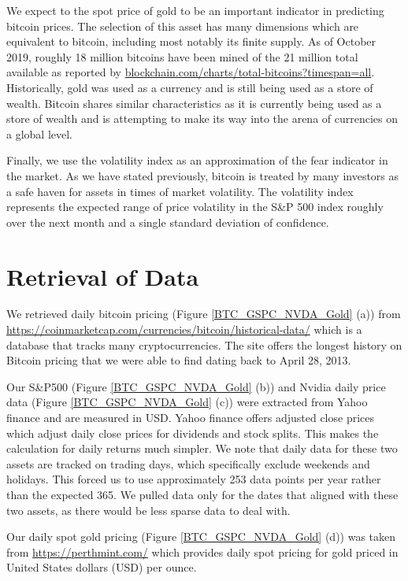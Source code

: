 \documentclass[9pt,twocolumn,twoside]{ilcss}
\begin{document}
We expect to the spot price of gold to be an important indicator in predicting bitcoin prices. The selection of this asset has many dimensions which are equivalent to bitcoin, including most notably its finite supply. As of October 2019, roughly 18 million bitcoins have been mined of the 21 million total available as reported by \url{blockchain.com/charts/total-bitcoins?timespan=all}. Historically, gold was used as a currency and is still being used as a store of wealth. Bitcoin shares similar characteristics as it is currently being used as a store of wealth and is attempting to make its way into the arena of currencies on a global level.

Finally, we use the volatility index as an approximation of the fear indicator in the market. As we have stated previously, bitcoin is treated by many investors as a safe haven for assets in times of market volatility. The volatility index represents the expected range of price volatility in the S\&P 500 index roughly over the next month and a single standard deviation of confidence.  

\section{Retrieval of Data}
We retrieved daily bitcoin pricing (Figure \ref{BTC_GSPC_NVDA_Gold} (a)) from \url{https://coinmarketcap.com/currencies/bitcoin/historical-data/} which is a database that tracks many cryptocurrencies. The site offers the longest history on Bitcoin pricing that we were able to find dating back to April 28, 2013.

Our S\&P500 (Figure \ref{BTC_GSPC_NVDA_Gold} (b)) and Nvidia daily price data (Figure \ref{BTC_GSPC_NVDA_Gold} (c)) were extracted from Yahoo finance and are measured in USD. Yahoo finance offers adjusted close prices which adjust daily close prices for dividends and stock splits. This makes the calculation for daily returns much simpler. We note that daily data for these two assets are tracked on trading days, which specifically exclude weekends and holidays. This forced us to use approximately 253 data points per year rather than the expected 365. We pulled data only for the dates that aligned with these two assets, as there would be less sparse data to deal with. 

Our daily spot gold pricing (Figure \ref{BTC_GSPC_NVDA_Gold} (d)) was taken from \url{https://perthmint.com/} which provides daily spot pricing for gold priced in United States dollars (USD) per ounce. 
\end{document}
